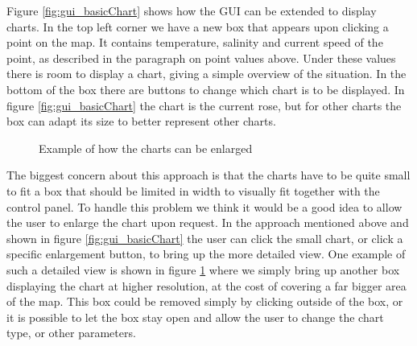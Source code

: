 \documentclass[11pt,a4paper,titlepage,oneside]{report}
\begin{document}
Figure \ref{fig:gui_basicChart} shows how the \gls{GUI} can be extended to display charts. In the top left corner we have a new box that appears upon clicking a point on the map. It contains temperature, salinity and current speed of the point, as described in the paragraph on point values above. Under these values there is room to display a chart, giving a simple overview of the situation. In the bottom of the box there are buttons to change which chart is to be displayed. In figure \ref{fig:gui_basicChart} the chart is the current rose, but for other charts the box can adapt its size to better represent other charts.

\begin{figure}[!htb]
  \begin{center}
    \caption{Example of how the charts can be enlarged}
    \label{fig:gui_enlargedChart}
  \end{center}
\end{figure}

The biggest concern about this approach is that the charts have to be quite small to fit a box that should be limited in width to visually fit together with the control panel. To handle this problem we think it would be a good idea to allow the user to enlarge the chart upon request. In the approach mentioned above and shown in figure \ref{fig:gui_basicChart} the user can click the small chart, or click a specific enlargement button, to bring up the more detailed view. One example of such a detailed view is shown in figure \ref{fig:gui_enlargedChart} where we simply bring up another box displaying the chart at higher resolution, at the cost of covering a far bigger area of the map. This box could be removed simply by clicking outside of the box, or it is possible to let the box stay open and allow the user to change the chart type, or other parameters.
\end{document}
